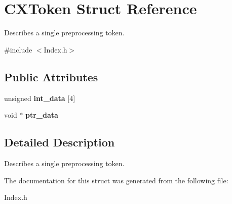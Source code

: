 \hypertarget{structCXToken}{}\section{C\+X\+Token Struct Reference}
\label{structCXToken}


Describes a single preprocessing token.  




{\ttfamily \#include $<$Index.\+h$>$}

\subsection*{Public Attributes}
\begin{DoxyCompactItemize}
\item 
\mbox{\label{structCXToken_a101b31d767c4a03879d728f64988dda0}} 
unsigned {\bfseries int\+\_\+data} \mbox{[}4\mbox{]}
\item 
\mbox{\label{structCXToken_ae5f315ff5564b9ac1f63b7745e74e831}} 
void $\ast$ {\bfseries ptr\+\_\+data}
\end{DoxyCompactItemize}


\subsection{Detailed Description}
Describes a single preprocessing token. 

The documentation for this struct was generated from the following file\+:\begin{DoxyCompactItemize}
\item 
Index.\+h\end{DoxyCompactItemize}
